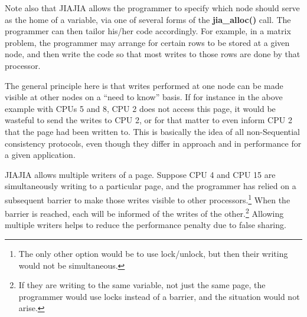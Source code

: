 Note also that JIAJIA allows the programmer to specify which node should
serve as the home of a variable, via one of several forms of the {\bf
jia\_alloc()} call.  The programmer can then tailor his/her code
accordingly.  For example, in a matrix problem, the programmer may
arrange for certain rows to be stored at a given node, and then write
the code so that most writes to those rows are done by that processor.

The general principle here is that writes performed at one node can be
made visible at other nodes on a ``need to know'' basis.  If for
instance in the above example with CPUs 5 and 8, CPU 2 does not access
this page, it would be wasteful to send the writes to CPU 2, or for that
matter to even inform CPU 2 that the page had been written to.  This is
basically the idea of all non-Sequential consistency protocols, even
though they differ in approach and in performance for a given
application.

JIAJIA allows multiple writers of a page.  Suppose CPU 4 and CPU 15 are
simultaneously writing to a particular page, and the programmer has
relied on a subsequent barrier to make those writes visible to other
processors.\footnote{The only other option would be to use lock/unlock,
but then their writing would not be simultaneous.}  When the barrier is
reached, each will be informed of the writes of the other.\footnote{If
they are writing to the same variable, not just the same page, the
programmer would use locks instead of a barrier, and the situation would
not arise.}  Allowing multiple writers helps to reduce the performance
penalty due to false sharing.

%
%
%
%
%
%
%
%
%
%

